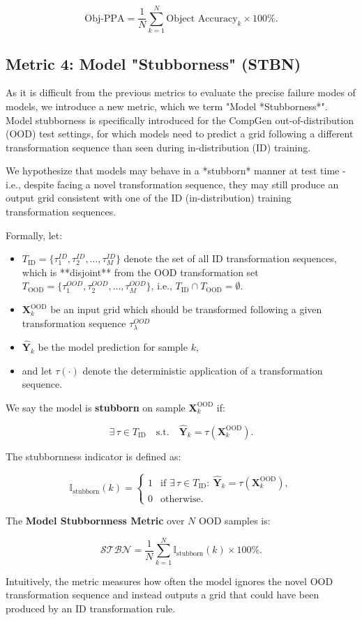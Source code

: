 $$
\text{Obj-PPA}
= \frac{1}{N} \sum_{k=1}^{N}
\text{Object Accuracy}_k
\times 100\%.
$$

\subsection{Metric 4: Model "Stubborness" (STBN)}

As it is difficult from the previous metrics to evaluate the precise failure modes of models, we introduce a new metric, which we term "Model *Stubborness*". Model stubborness is specifically introduced for the CompGen out-of-distribution (OOD) test settings, for which models need to predict a grid following a different transformation sequence than seen during in-distribution (ID) training.

We hypothesize that models may behave in a *stubborn* manner at test time - i.e., despite facing a novel transformation sequence, they may still produce an output grid consistent with one of the ID (in-distribution) training transformation sequences.

Formally, let:
\begin{itemize}
    \item $T_{\text{ID}} = \{ \tau^{ID}_1, \tau^{ID}_2, \dots, \tau^{ID}_M \}$ denote the set of all ID transformation sequences, which is **disjoint** from the OOD transformation set $T_{\text{OOD}} = \{ \tau^{OOD}_1, \tau^{OOD}_2, \dots, \tau^{OOD}_M \}$, i.e., $T_{\text{ID}} \cap T_{\text{OOD}} = \emptyset$.
    \item $\mathbf{X}_k^{\text{OOD}}$ be an input grid which should be transformed following a   given transformation sequence $\tau^{OOD}_{\lambda}$
    \item $\hat{\mathbf{Y}}_k$ be the model prediction for sample $k$,
    \item and let $\tau(\cdot)$ denote the deterministic application of a transformation sequence.
\end{itemize}

We say the model is \textbf{stubborn} on sample $\mathbf{X}_k^{\text{OOD}}$ if:

$$
\exists\, \tau \in T_{\text{ID}} \quad \text{s.t.} \quad 
\hat{\mathbf{Y}}_k = \tau(\mathbf{X}_k^{\text{OOD}}).
$$

The stubbornness indicator is defined as:

$$
\mathbb{I}_{\text{stubborn}}(k) =
\begin{cases}
1 & \text{if } \exists\, \tau \in T_{\text{ID}} :\ 
\hat{\mathbf{Y}}_k = \tau(\mathbf{X}_k^{\text{OOD}}), \\[6pt]
0 & \text{otherwise.}
\end{cases}
$$

The \textbf{Model Stubbornness Metric} over $N$ OOD samples is:

$$
\mathcal{STBN}
= \frac{1}{N} 
\sum_{k=1}^{N} \mathbb{I}_{\text{stubborn}}(k)
\times 100\%.
$$

Intuitively, the metric measures how often the model ignores the novel OOD transformation sequence and instead outputs a grid that could have been produced by an ID transformation rule.